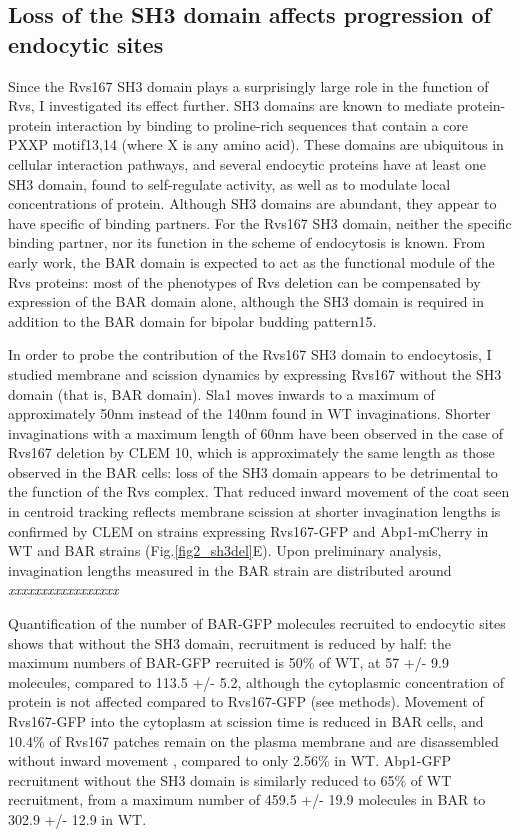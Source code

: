 	\subsection{Loss of the SH3 domain affects progression of \\endocytic sites}
	\label{delsh3_movement}
Since the Rvs167 SH3 domain plays a surprisingly large role in the function of Rvs, I investigated its effect further. SH3 domains are known to mediate protein-protein interaction by binding to proline-rich sequences that contain a core PXXP motif13,14 (where X is any amino acid). These domains are ubiquitous in cellular interaction pathways, and several endocytic proteins have at least one SH3 domain, found to self-regulate activity, as well as to modulate local concentrations of protein. Although SH3 domains are abundant, they appear to have specific of binding partners. For the Rvs167 SH3 domain, neither the specific binding partner, nor its function in the scheme of endocytosis is known. From early work, the BAR domain is expected to act as the functional module of the Rvs proteins: most of the phenotypes of Rvs deletion can be compensated by expression of the BAR domain alone, although the SH3 domain is required in addition to the BAR domain for bipolar budding pattern15. 

	\vspace{5mm}
In order to probe the contribution of the Rvs167 SH3 domain to endocytosis, I studied membrane and scission dynamics by expressing Rvs167 without the SH3 domain (that is, BAR domain). Sla1 moves inwards to a maximum of approximately 50nm instead of the 140nm found in WT invaginations. Shorter invaginations with a maximum length of 60nm have been observed in the case of Rvs167 deletion by CLEM 10, which is approximately the same length as those observed in the BAR cells: loss of the SH3 domain appears to be detrimental to the function of the Rvs complex. That reduced inward movement of the coat seen in centroid tracking reflects membrane scission at shorter invagination lengths is confirmed by CLEM on strains expressing Rvs167-GFP and Abp1-mCherry in WT and BAR strains (Fig.\ref{fig2_sh3del}E). Upon preliminary analysis, invagination lengths measured in the BAR strain are distributed around \textit{xxxxxxxxxxxxxxxxx}

	\vspace{5mm}
Quantification of the number of BAR-GFP molecules recruited to endocytic sites shows that without the SH3 domain, recruitment is reduced by half: the maximum numbers of BAR-GFP recruited is 50\% of WT, at 57 +/- 9.9 molecules, compared to 113.5 +/- 5.2, although the cytoplasmic concentration of protein is not affected compared to Rvs167-GFP (see methods). Movement of Rvs167-GFP into the cytoplasm at scission time is reduced in BAR cells, and 10.4\% of Rvs167 patches remain on the plasma membrane and are disassembled without inward movement , compared to only 2.56\% in WT.  Abp1-GFP recruitment without the SH3 domain is similarly reduced to 65\% of WT recruitment, from a maximum number of 459.5 +/- 19.9 molecules in BAR to 302.9 +/- 12.9 in WT. 

